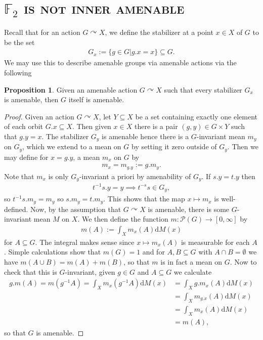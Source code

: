 \documentclass[10pt,oneside,openany,final]{memoir}
\newcommand{\ssection}[1]{%
\newpage%
\section[#1]{\centering\normalfont\scshape \textbf{#1}}}
\theoremstyle{definition}
\newtheorem{proposition}[theorem]{Proposition}
\theoremstyle{Break}
\renewcommand{\d}{\mathrm{d}}
\def\acts{\curvearrowright}
\begin{document}
\ssection{$\mathbb{F}_2$ is not inner amenable}
Recall that for an action $G \acts X$, we define the stabilizer at a point $x \in X$ of $G$ to be the set 
\begin{align*}
	G_x:=\{g \in G | g.x =x\} \subseteq G.
\end{align*}
We may use this to describe amenable groups via amenable actions via the following
\begin{proposition}
	Given an amenable action $G \acts X$ such that every stabilizer $G_x$ is amenable, then $G$ itself is amenable.
\end{proposition}
\begin{proof}
Given an action $G \acts X$, let $Y \subseteq X$ be a set containing exactly one element of each orbit $G.x \subseteq X$. Then given $x \in X$ there is a pair $(g,y) \in G\times Y$ such that $g.y=x$. The stabilizer $G_y$ is amenable hence there is a $G$-invariant mean $m_y$ on $G_y$, which we extend to a mean on $G$ by setting it zero outside of $G_y$. Then we may define for $x=g.y$, a mean $m_x$ on $G$ by
\begin{align*}
	m_x=m_{g.y}:=g.m_y.
\end{align*}
Note that $m_x$ is only $G_y$-invariant a priori by amenability of $G_y$. If $s.y=t.y$ then 
\begin{align*}
	t^{-1}s.y=y \implies t^{-s}s \in G_y,
\end{align*}
so $t^{-1}s.m_y=m_y$ so $s.m_y=t.m_y$. This shows that the map $x \mapsto m_x$ is well-defined. Now, by the assumption that $G \acts X$ is amenable, there is some $G$-invariant mean $M$ on $X$. We then define the function $m \colon \mathcal{P}(G) \to [0,\infty]$ by 
\begin{align*}
	m(A):=\int_X m_x(A) \d M(x)
\end{align*}
for $A \subseteq G$. The integral makes sense since $x \mapsto m_x(A)$ is measurable for each $A$. Simple calculations show that $m(G)=1$ and for $A,B \subseteq G$ with $A \cap B=\emptyset$ we have $m(A \cup B)=m(A)+m(B)$, so that $m$ is in fact a mean on $G$. Now to check that this is $G$-invariant, given $g \in G$ and $A \subseteq G$ we calculate
\begin{align*}
	g.m(A)=m(g^{-1}A)=\int_X m_x(g^{-1}A) \d M(x) &= \int_X g.m_x(A) \d M(x)\\ &= \int_X m_{g.x}(A) \d M(x)\\ &= \int_X m_x(A) \d M(x) \\&= m(A),
\end{align*}
so that $G$ is amenable.
\end{proof}
\end{document}

